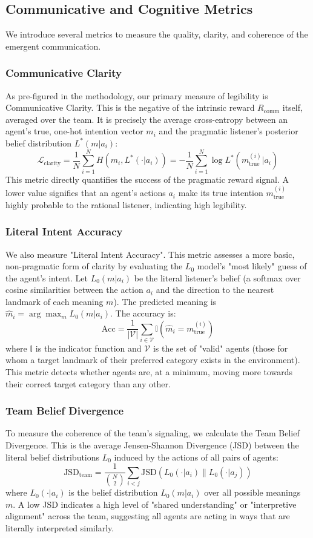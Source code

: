 \documentclass[12pt, a4paper]{report}
\newcommand{\Rcomm}{R_{\text{comm}}}
\begin{document}
\subsection{Communicative and Cognitive Metrics}
We introduce several metrics to measure the quality, clarity, and coherence of the emergent communication.

\subsubsection{Communicative Clarity}
As pre-figured in the methodology, our primary measure of legibility is Communicative Clarity. This is the negative of the intrinsic reward $\Rcomm$ itself, averaged over the team. It is precisely the average cross-entropy between an agent's true, one-hot intention vector $m_i$ and the pragmatic listener's posterior belief distribution $L^*(m|a_i)$:
$$ \mathcal{L}_{\text{clarity}} = \frac{1}{N} \sum_{i=1}^N H(m_i, L^*(\cdot|a_i)) = - \frac{1}{N} \sum_{i=1}^N \log L^*(m_{\text{true}}^{(i)} | a_i) $$
This metric directly quantifies the success of the pragmatic reward signal. A lower value signifies that an agent's actions $a_i$ make its true intention $m_{\text{true}}^{(i)}$ highly probable to the rational listener, indicating high legibility.

\subsubsection{Literal Intent Accuracy}
We also measure "Literal Intent Accuracy". This metric assesses a more basic, non-pragmatic form of clarity by evaluating the $L_0$ model's "most likely" guess of the agent's intent. Let $L_0(m|a_i)$ be the literal listener's belief (a softmax over cosine similarities between the action $a_i$ and the direction to the nearest landmark of each meaning $m$). The predicted meaning is $\hat{m}_i = \arg\max_m L_0(m|a_i)$. The accuracy is:
$$ \text{Acc} = \frac{1}{|\mathcal{V}|} \sum_{i \in \mathcal{V}} \mathbb{I}(\hat{m}_i = m_{\text{true}}^{(i)}) $$
where $\mathbb{I}$ is the indicator function and $\mathcal{V}$ is the set of "valid" agents (those for whom a target landmark of their preferred category exists in the environment). This metric detects whether agents are, at a minimum, moving more towards their correct target category than any other.

\subsubsection{Team Belief Divergence}
To measure the coherence of the team's signaling, we calculate the Team Belief Divergence. This is the average Jensen-Shannon Divergence (JSD) between the literal belief distributions $L_0$ induced by the actions of all pairs of agents:
$$ \text{JSD}_{\text{team}} = \frac{1}{\binom{N}{2}} \sum_{i<j} \text{JSD}\left(L_0(\cdot|a_i) \parallel L_0(\cdot|a_j)\right) $$
where $L_0(\cdot|a_i)$ is the belief distribution $L_0(m|a_i)$ over all possible meanings $m$. A low JSD indicates a high level of "shared understanding" or "interpretive alignment" across the team, suggesting all agents are acting in ways that are literally interpreted similarly.
\end{document}
